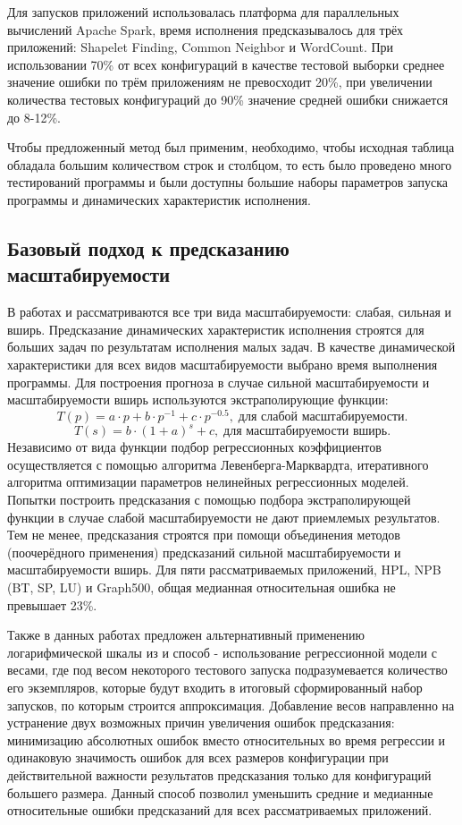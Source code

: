 		Для запусков приложений использовалась платформа для параллельных вычислений Apache Spark, время исполнения предсказывалось для трёх приложений: Shapelet Finding, Common Neighbor и WordCount. При использовании 70\% от всех конфигураций в качестве тестовой выборки среднее значение ошибки по трём приложениям не превосходит 20\%, при увеличении количества тестовых конфигураций до 90\% значение средней ошибки снижается до 8-12\%.

		Чтобы предложенный метод был применим, необходимо, чтобы исходная таблица обладала большим количеством строк и столбцом, то есть было проведено много тестирований программы и были доступны большие наборы параметров запуска программы и динамических характеристик исполнения.

	\subsection{Базовый подход к предсказанию масштабируемости}
		В работах \cite{Kazmina_Antonov_article} и \cite{Kazminf_Valkon_Antonov_article} рассматриваются все три вида масштабируемости: слабая, сильная и вширь. Предсказание динамических характеристик исполнения строятся для больших задач по результатам исполнения малых задач. В качестве динамической характеристики для всех видов масштабируемости выбрано время выполнения программы. Для построения прогноза в случае сильной масштабируемости и масштабируемости вширь используются экстраполирующие функции:
		\[
		T(p) = a \cdot p + b \cdot p^{-1} + c \cdot p^{-0.5},\;\text{для слабой масштабируемости}.
		\]
		\[
		T(s) = b \cdot (1 + a)^{s} + c,\;\text{для масштабируемости вширь}.
		\]
		Независимо от вида функции подбор регрессионных коэффициентов осуществляется с помощью алгоритма Левенберга-Марквардта, итеративного алгоритма оптимизации параметров нелинейных регрессионных моделей. Попытки построить предсказания с помощью подбора экстраполирующей функции в случае слабой масштабируемости не дают приемлемых результатов. Тем не менее, предсказания строятся при помощи объединения методов (поочерёдного применения) предсказаний сильной масштабируемости и масштабируемости вширь. Для пяти рассматриваемых приложений, HPL, NPB (BT, SP, LU) и Graph500, общая медианная относительная ошибка не превышает 23\%. 

		Также в данных работах предложен альтернативный применению логарифмической шкалы из \cite{log_main} и \cite{focused_regression} способ - использование регрессионной модели с весами, где под весом некоторого тестового запуска подразумевается количество его экземпляров, которые будут входить в итоговый сформированный набор запусков, по которым строится аппроксимация. Добавление весов направленно на устранение двух возможных причин увеличения ошибок предсказания: минимизацию абсолютных ошибок вместо относительных во время регрессии и одинаковую значимость ошибок для всех размеров конфигурации при действительной важности результатов предсказания только для конфигураций большего размера. Данный способ позволил уменьшить средние и медианные относительные ошибки предсказаний для всех рассматриваемых приложений.

